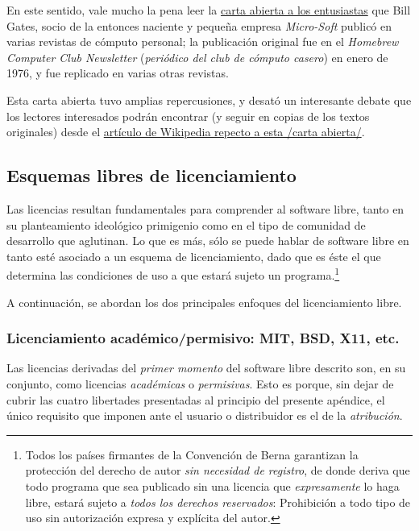 \documentclass[11pt,fleqn]{book} %
\begin{document}
En este sentido, vale mucho la pena leer la \href{https://upload.wikimedia.org/wikipedia/commons/1/14/Bill_Gates_Letter_to_Hobbyists.jpg}{carta abierta a los entusiastas} que Bill Gates, socio de la entonces naciente y pequeña
empresa \emph{Micro-Soft} publicó en varias revistas de cómputo personal;
la publicación original fue en el \emph{Homebrew Computer Club Newsletter}
(\emph{periódico del club de cómputo casero}) en enero de 1976, y fue
replicado en varias otras revistas.

Esta carta abierta tuvo amplias repercusiones, y desató un interesante
debate que los lectores interesados podrán encontrar (y seguir en
copias de los textos originales) desde el \href{https://en.wikipedia.org/wiki/Open_Letter_to_Hobbyists}{artículo de Wikipedia repecto a esta /carta abierta/}.
\subsection{Esquemas libres de licenciamiento}
\label{sec-8-1-4}


Las licencias resultan fundamentales para comprender al software
libre, tanto en su planteamiento ideológico primigenio como en el tipo
de comunidad de desarrollo que aglutinan. Lo que es más, sólo se puede
hablar de software libre en tanto esté asociado a un esquema de
licenciamiento, dado que es éste el que determina las condiciones de
uso a que estará sujeto un programa.\footnote{Todos los países firmantes
de la Convención de Berna garantizan la protección del derecho de
autor \emph{sin necesidad de registro}, de donde deriva que todo programa
que sea publicado sin una licencia que \emph{expresamente} lo haga libre,
estará sujeto a \emph{todos los derechos reservados}: Prohibición a todo
tipo de uso sin autorización expresa y explícita del autor. }

A continuación, se abordan los dos principales enfoques del
licenciamiento libre.
\subsubsection{Licenciamiento académico/permisivo: MIT, BSD, X11, etc.}
\label{sec-8-1-4-1}


Las licencias derivadas del \emph{primer momento} del software libre
descrito son, en su conjunto, como licencias \emph{académicas} o
\emph{permisivas}. Esto es porque, sin dejar de cubrir las cuatro
libertades presentadas al principio del presente apéndice, el único
requisito que imponen ante el usuario o distribuidor es el de la
\emph{atribución}.
\end{document}
